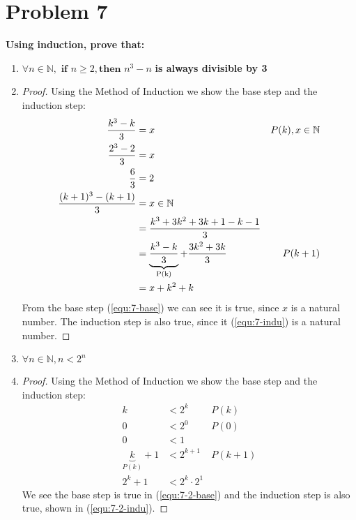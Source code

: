 \documentclass[english,11pt,a4paper]{article}
\begin{document}
\section*{Problem 7}
\textbf{Using induction, prove that:}
\begin{enumerate}[a]
\item $\forall n \in \mathbb{N},\textbf{ if }n \geq 2, \textbf{then }n^3-n$ \textbf{is always divisible by 3}
\item[] 
\begin{proof}
Using the Method of Induction we show the base step and the induction step:
\begin{align}
\dfrac{k^3-k}{3} &= x & P(k),x \in \mathbb{N}\\
\dfrac{2^3-2}{3} &= x\\
\dfrac{6}{3} &= 2\label{equ:7-base} \\
\dfrac{(k+1)^3-(k+1)}{3} &= x \in \mathbb{N}\\
	&= \dfrac{k^3+3k^2+3k+1-k-1}{3} \\
	&= \underbrace{\dfrac{k^3-k}{3}}_{\mathclap{\text{P(k)}}}+\dfrac{3k^2+3k}{3} & P(k+1)\\
	&= x+k^2+k \label{equ:7-indu}
\end{align}
From the base step (\ref{equ:7-base}) we can see it is true, since $x$ is a natural number. 
The induction step is also true, since it (\ref{equ:7-indu}) is a natural number.
\end{proof}

\item $\forall n \in \mathbb{N}, n<2^n$
\item[]
\begin{proof}
Using the Method of Induction we show the base step and the induction step:
\begin{align}
k &< 2^k & P(k)\\
0 &< 2^0 & P(0)\\
0 &< 1 \label{equ:7-2-base}\\
\underbrace{k}_{P(k)}+1 &< 2^{k+1} & P(k+1)\\
2^k	+1 &< 2^k \cdot 2^1 \label{equ:7-2-indu}
\end{align}
We see the base step is true in (\ref{equ:7-2-base}) and the induction step is also true, shown in (\ref{equ:7-2-indu}).
\end{proof}
\end{enumerate}
\end{document}
